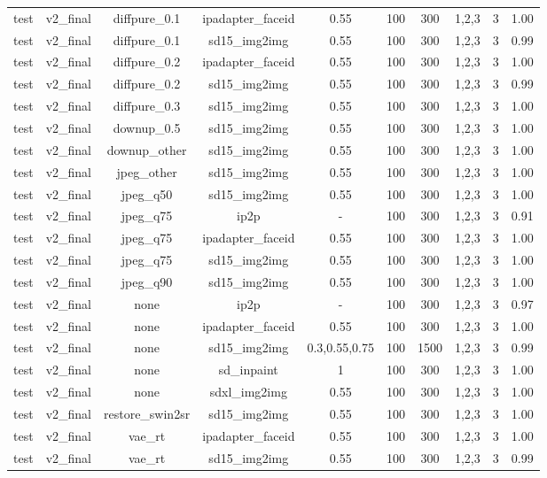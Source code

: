 \begin{table}[t]
{\begin{tabular}{lccccccccc}
test & v2\_final & diffpure\_0.1 & ipadapter\_faceid & 0.55 & 100 & 300 & 1,2,3 & 3 & 1.00 \\
test & v2\_final & diffpure\_0.1 & sd15\_img2img & 0.55 & 100 & 300 & 1,2,3 & 3 & 0.99 \\
test & v2\_final & diffpure\_0.2 & ipadapter\_faceid & 0.55 & 100 & 300 & 1,2,3 & 3 & 1.00 \\
test & v2\_final & diffpure\_0.2 & sd15\_img2img & 0.55 & 100 & 300 & 1,2,3 & 3 & 0.99 \\
test & v2\_final & diffpure\_0.3 & sd15\_img2img & 0.55 & 100 & 300 & 1,2,3 & 3 & 1.00 \\
test & v2\_final & downup\_0.5 & sd15\_img2img & 0.55 & 100 & 300 & 1,2,3 & 3 & 1.00 \\
test & v2\_final & downup\_other & sd15\_img2img & 0.55 & 100 & 300 & 1,2,3 & 3 & 1.00 \\
test & v2\_final & jpeg\_other & sd15\_img2img & 0.55 & 100 & 300 & 1,2,3 & 3 & 1.00 \\
test & v2\_final & jpeg\_q50 & sd15\_img2img & 0.55 & 100 & 300 & 1,2,3 & 3 & 1.00 \\
test & v2\_final & jpeg\_q75 & ip2p & - & 100 & 300 & 1,2,3 & 3 & 0.91 \\
test & v2\_final & jpeg\_q75 & ipadapter\_faceid & 0.55 & 100 & 300 & 1,2,3 & 3 & 1.00 \\
test & v2\_final & jpeg\_q75 & sd15\_img2img & 0.55 & 100 & 300 & 1,2,3 & 3 & 1.00 \\
test & v2\_final & jpeg\_q90 & sd15\_img2img & 0.55 & 100 & 300 & 1,2,3 & 3 & 1.00 \\
test & v2\_final & none & ip2p & - & 100 & 300 & 1,2,3 & 3 & 0.97 \\
test & v2\_final & none & ipadapter\_faceid & 0.55 & 100 & 300 & 1,2,3 & 3 & 1.00 \\
test & v2\_final & none & sd15\_img2img & 0.3,0.55,0.75 & 100 & 1500 & 1,2,3 & 3 & 0.99 \\
test & v2\_final & none & sd\_inpaint & 1 & 100 & 300 & 1,2,3 & 3 & 1.00 \\
test & v2\_final & none & sdxl\_img2img & 0.55 & 100 & 300 & 1,2,3 & 3 & 1.00 \\
test & v2\_final & restore\_swin2sr & sd15\_img2img & 0.55 & 100 & 300 & 1,2,3 & 3 & 1.00 \\
test & v2\_final & vae\_rt & ipadapter\_faceid & 0.55 & 100 & 300 & 1,2,3 & 3 & 1.00 \\
test & v2\_final & vae\_rt & sd15\_img2img & 0.55 & 100 & 300 & 1,2,3 & 3 & 0.99 \\

\end{tabular}}
\end{table}
